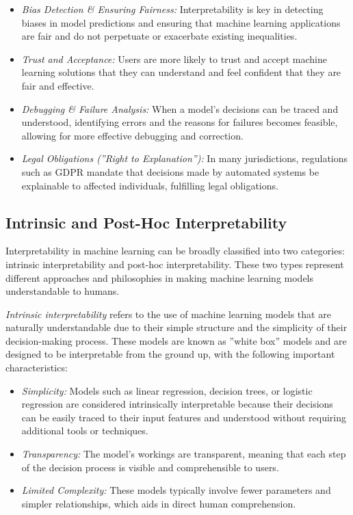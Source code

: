 \begin{itemize}
\item \emph{Bias Detection \& Ensuring Fairness:} Interpretability is key in detecting biases in model predictions and ensuring that machine learning applications are fair and do not perpetuate or exacerbate existing inequalities.

\item \emph{Trust and Acceptance:} Users are more likely to trust and accept machine learning solutions that they can understand and feel confident that they are fair and effective.

\item \emph{Debugging \& Failure Analysis:} When a model's decisions can be traced and understood, identifying errors and the reasons for failures becomes feasible, allowing for more effective debugging and correction.

\item \emph{Legal Obligations (''Right to Explanation''):} In many jurisdictions, regulations such as GDPR mandate that decisions made by automated systems be explainable to affected individuals, fulfilling legal obligations.
\end{itemize}

\subsection*{Intrinsic and Post-Hoc Interpretability}

Interpretability in machine learning can be broadly classified into two categories: intrinsic interpretability and post-hoc interpretability. These two types represent different approaches and philosophies in making machine learning models understandable to humans. 

\emph{Intrinsic interpretability} refers to the use of machine learning models that are naturally understandable due to their simple structure and the simplicity of their decision-making process. These models are known as ''white box'' models and are designed to be interpretable from the ground up, with the following important characteristics:

\begin{itemize}
\item \emph{Simplicity:} Models such as linear regression, decision trees, or logistic regression are considered intrinsically interpretable because their decisions can be easily traced to their input features and understood without requiring additional tools or techniques.
\item \emph{Transparency:} The model's workings are transparent, meaning that each step of the decision process is visible and comprehensible to users.
\item \emph{Limited Complexity:} These models typically involve fewer parameters and simpler relationships, which aids in direct human comprehension.
\end{itemize}

